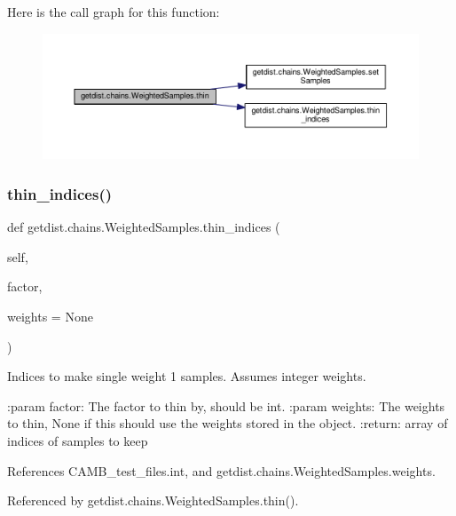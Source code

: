 Here is the call graph for this function\+:
\nopagebreak
\begin{figure}[H]
\begin{center}
\leavevmode
\includegraphics[width=350pt]{classgetdist_1_1chains_1_1WeightedSamples_a99cf3cd470c17389b594acbe0c02f174_cgraph}
\end{center}
\end{figure}
\mbox{\label{classgetdist_1_1chains_1_1WeightedSamples_a41dc494a820fc43ecbf7a58dd32e4602}} 
\subsubsection{\texorpdfstring{thin\+\_\+indices()}{thin\_indices()}}
{\footnotesize\ttfamily def getdist.\+chains.\+Weighted\+Samples.\+thin\+\_\+indices (\begin{DoxyParamCaption}\item[{}]{self,  }\item[{}]{factor,  }\item[{}]{weights = {\ttfamily None} }\end{DoxyParamCaption})}

\begin{DoxyVerb}Indices to make single weight 1 samples. Assumes integer weights.

:param factor: The factor to thin by, should be int.
:param weights: The weights to thin, None if this should use the weights stored in the object.
:return: array of indices of samples to keep
\end{DoxyVerb}
 

References C\+A\+M\+B\+\_\+test\+\_\+files.\+int, and getdist.\+chains.\+Weighted\+Samples.\+weights.



Referenced by getdist.\+chains.\+Weighted\+Samples.\+thin().

